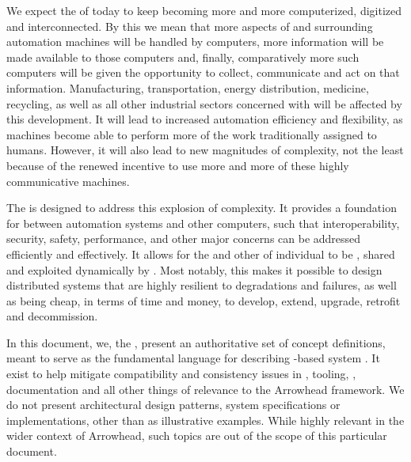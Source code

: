 %
%

We expect the  of today to keep becoming more and more computerized, digitized and interconnected.
By this we mean that more aspects of and surrounding automation machines will be handled by computers, more information will be made available to those computers and, finally, comparatively more such computers will be given the opportunity to collect, communicate and act on that information.
Manufacturing, transportation, energy distribution, medicine, recycling, as well as all other industrial sectors concerned with  will be affected by this development.
It will lead to increased automation efficiency and flexibility, as machines become able to perform more of the work traditionally assigned to humans.
However, it will also lead to new magnitudes of complexity, not the least because of the renewed incentive to use more and more of these highly communicative machines.

The  is designed to address this explosion of complexity.
It provides a foundation for  \cite{mackenzie2006reference} between automation systems and other computers, such that interoperability, security, safety, performance, and other major concerns can be addressed efficiently and effectively.
It allows for the  and other  of individual  to be , shared and exploited dynamically by  .
Most notably, this makes it possible to design distributed systems that are highly resilient to degradations and failures, as well as being cheap, in terms of time and money, to develop, extend, upgrade, retrofit and decommission.

In this document, we, the , present an authoritative set of concept definitions, meant to serve as the fundamental language for describing -based system .
It exist to help mitigate compatibility and consistency issues in , tooling, , documentation and all other things of relevance to the Arrowhead framework.
We do not present architectural design patterns, system specifications or implementations, other than as illustrative examples.
While highly relevant in the wider context of Arrowhead, such topics are out of the scope of this particular document.

